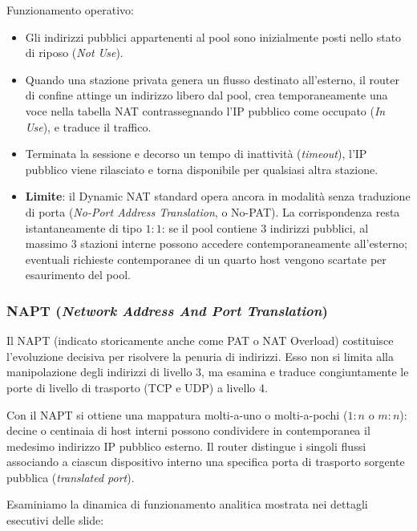 \documentclass[11pt, a4paper]{article}
\begin{document}
Funzionamento operativo:
\begin{itemize}
    \item Gli indirizzi pubblici appartenenti al pool sono inizialmente posti nello stato di riposo (\emph{Not Use}).
    \item Quando una stazione privata genera un flusso destinato all'esterno, il router di confine attinge un indirizzo libero dal pool, crea temporaneamente una voce nella tabella NAT contrassegnando l'IP pubblico come occupato (\emph{In Use}), e traduce il traffico.
    \item Terminata la sessione e decorso un tempo di inattività (\emph{timeout}), l'IP pubblico viene rilasciato e torna disponibile per qualsiasi altra stazione.
    \item \textbf{Limite}: il Dynamic NAT standard opera ancora in modalità senza traduzione di porta (\emph{No-Port Address Translation}, o No-PAT). La corrispondenza resta istantaneamente di tipo $1:1$: se il pool contiene 3 indirizzi pubblici, al massimo 3 stazioni interne possono accedere contemporaneamente all'esterno; eventuali richieste contemporanee di un quarto host vengono scartate per esaurimento del pool.
\end{itemize}

\subsubsection{NAPT (\emph{Network Address And Port Translation})}
Il NAPT (indicato storicamente anche come PAT o NAT Overload) costituisce l'evoluzione decisiva per risolvere la penuria di indirizzi. Esso non si limita alla manipolazione degli indirizzi di livello 3, ma esamina e traduce congiuntamente le porte di livello di trasporto (TCP e UDP) a livello 4.


Con il NAPT si ottiene una mappatura molti-a-uno o molti-a-pochi ($1:n$ o $m:n$): decine o centinaia di host interni possono condividere in contemporanea il medesimo indirizzo IP pubblico esterno. Il router distingue i singoli flussi associando a ciascun dispositivo interno una specifica porta di trasporto sorgente pubblica (\emph{translated port}).

Esaminiamo la dinamica di funzionamento analitica mostrata nei dettagli esecutivi delle slide:
\end{document}

